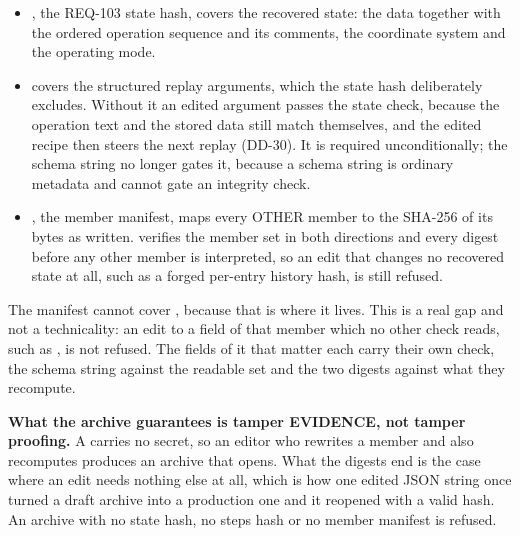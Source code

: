 \begin{itemize}[noitemsep,topsep=2pt]
  \item {}, the REQ-103 state hash, covers the recovered
    state: the data together with the ordered operation sequence and its
    comments, the coordinate system and the operating mode.
  \item {} covers the structured replay arguments, which
    the state hash deliberately excludes. Without it an edited argument
    passes the state check, because the operation text and the stored
    data still match themselves, and the edited recipe then steers the
    next replay (DD-30). It is required unconditionally; the schema
    string no longer gates it, because a schema string is ordinary
    metadata and cannot gate an integrity check.
  \item {}, the member manifest, maps every OTHER member to
    the SHA-256 of its bytes as written.  verifies the
    member set in both directions and every digest before any other
    member is interpreted, so an edit that changes no recovered state at
    all, such as a forged per-entry history hash, is still refused.
\end{itemize}

The manifest cannot cover , because that is where it
lives. This is a real gap and not a technicality: an edit to a field of
that member which no other check reads, such as ,
is not refused. The fields of it that matter each carry their own check,
the schema string against the readable set and the two digests against
what they recompute.

\textbf{What the archive guarantees is tamper EVIDENCE, not tamper
proofing.} A  carries no secret, so an editor who rewrites a
member and also recomputes  produces an archive that
opens. What the digests end is the case where an edit needs nothing else
at all, which is how one edited JSON string once turned a draft archive
into a production one and it reopened with a valid hash. An archive with
no state hash, no steps hash or no member manifest is refused.

